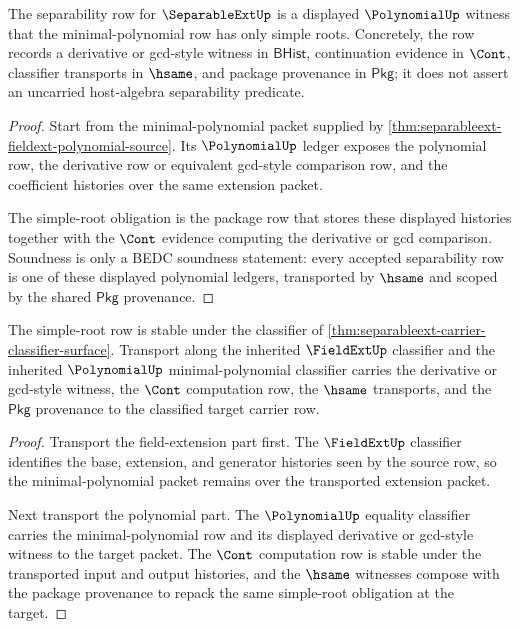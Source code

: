 \begin{theorem}
\label{thm:separableext-simple-root-obligation}
The separability row for $\SeparableExtUp$ is a displayed $\PolynomialUp$ witness that the minimal-polynomial row has only simple roots. Concretely, the row records a derivative or gcd-style witness in $\mathsf{BHist}$, continuation evidence in $\Cont$, classifier transports in $\hsame$, and package provenance in $\mathsf{Pkg}$; it does not assert an uncarried host-algebra separability predicate.
\end{theorem}
\begin{proof}
Start from the minimal-polynomial packet supplied by \autoref{thm:separableext-fieldext-polynomial-source}. Its $\PolynomialUp$ ledger exposes the polynomial row, the derivative row or equivalent gcd-style comparison row, and the coefficient histories over the same extension packet.

The simple-root obligation is the package row that stores these displayed histories together with the $\Cont$ evidence computing the derivative or gcd comparison. Soundness is only a BEDC soundness statement: every accepted separability row is one of these displayed polynomial ledgers, transported by $\hsame$ and scoped by the shared $\mathsf{Pkg}$ provenance.
\end{proof}

\begin{theorem}
\label{thm:separableext-classifier-stability}
The simple-root row is stable under the classifier of \autoref{thm:separableext-carrier-classifier-surface}. Transport along the inherited $\FieldExtUp$ classifier and the inherited $\PolynomialUp$ minimal-polynomial classifier carries the derivative or gcd-style witness, the $\Cont$ computation row, the $\hsame$ transports, and the $\mathsf{Pkg}$ provenance to the classified target carrier row.
\end{theorem}
\begin{proof}
Transport the field-extension part first. The $\FieldExtUp$ classifier identifies the base, extension, and generator histories seen by the source row, so the minimal-polynomial packet remains over the transported extension packet.

Next transport the polynomial part. The $\PolynomialUp$ equality classifier carries the minimal-polynomial row and its displayed derivative or gcd-style witness to the target packet. The $\Cont$ computation row is stable under the transported input and output histories, and the $\hsame$ witnesses compose with the package provenance to repack the same simple-root obligation at the target.
\end{proof}

